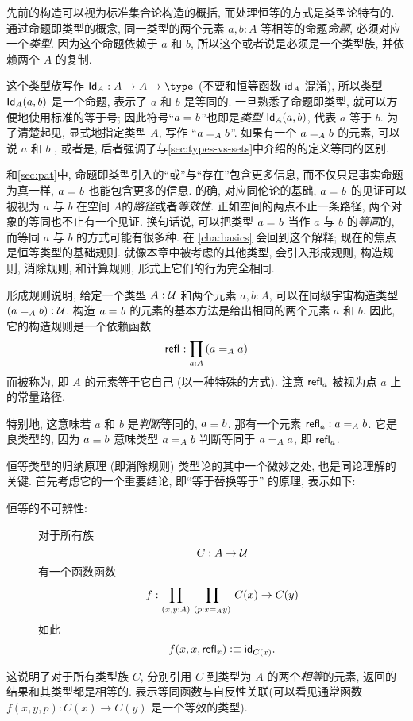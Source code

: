 %
%
%
%
先前的构造可以视为标准集合论构造的概括, 而处理恒等的方式是类型论特有的.
通过命题即类型的概念, 同一类型的两个元素 $a,b:A$ 等相等的命题\emph{命题}, 必须对应一个\emph{类型}.
因为这个命题依赖于 $a$ 和 $b$, 所以这个或者说是必须是一个类型族, 并依赖两个 $A$ 的复制.

这个类型族写作 $\idtypevar{A}:A\to A\to\type$ (不要和恒等函数 $\idfunc[A]$ 混淆), 所以类型 $\idtype[A]ab$ 是一个命题, 表示了 $a$ 和 $b$ 是等同的.
一旦熟悉了命题即类型, 就可以方便地使用标准的等于号;
因此符号``$\id{a}{b}$''也即是\emph{类型} $\idtype[A]ab$, 代表 $a$ 等于 $b$.
为了清楚起见, 显式地指定类型 $A$, 写作 ``$\id[A]{a}{b}$''.
如果有一个 $\id[A]{a}{b}$ 的元素, 可以说 $a$ 和 $b$ , 或者是, 后者强调了与\cref{sec:types-vs-sets}中介绍的的定义等同的区别.
%
%

和\cref{sec:pat}中, 命题即类型引入的``或''与``存在''包含更多信息, 而不仅只是事实命题为真一样, $\id{a}{b}$ 也能包含更多的信息.
的确, 对应同伦论的基础, $\id{a}{b}$ 的见证可以被视为 $a$ 与 $b$ 在空间 $A$的\emph{路径}或者\emph{等效性}.
正如空间的两点不止一条路径, 两个对象的等同也不止有一个见证.
换句话说, 可以把类型 $\id{a}{b}$ 当作 $a$ 与 $b$ 的\emph{等同}的, 而等同 $a$ 与 $b$ 的方式可能有很多种.
在 \cref{cha:basics} 会回到这个解释;
现在的焦点是恒等类型的基础规则.
就像本章中被考虑的其他类型, 会引入形成规则, 构造规则, 消除规则, 和计算规则, 形式上它们的行为完全相同.

形成规则说明, 给定一个类型 $A:\UU$ 和两个元素 $a,b:A$, 可以在同级宇宙构造类型 $(\id[A]{a}{b}):\UU$.
构造 $\id{a}{b}$ 的元素的基本方法是给出相同的两个元素 $a$ 和 $b$.
因此, 它的构造规则是一个依赖函数
\[
    \refl{} : \prd{a:A} (\id[A]{a}{a})
\]
而被称为,
%
即 $A$ 的元素等于它自己 (以一种特殊的方式).
注意 $\refl{a}$ 被视为点 $a$ 上的常量路径.

特别地, 这意味若 $a$ 和 $b$ 是\emph{判断}等同的, $a\jdeq b$, 那有一个元素 $\refl{a} : \id[A]{a}{b}$.
它是良类型的, 因为 $a\jdeq b$ 意味类型 $\id[A]{a}{b}$ 判断等同于 $\id[A]{a}{a}$, 即 $\refl{a}$.

恒等类型的归纳原理 (即消除规则) 类型论的其中一个微妙之处, 也是同论理解的关键.
首先考虑它的一个重要结论, 即``等于替换等于'' 的原理, 表示如下: %
%
\begin{description}
    \item[恒等的不可辨性:]
    对于所有族
    \[
        C : A \to \UU
    \]
    有一个函数函数
    \[
        f : \prd{x,y:A}{p:\id[A] x y} C(x) \to C(y)
    \]
    如此
    \[
        f(x,x,\refl{x}) \defeq \idfunc[C(x)].
    \]
\end{description}
这说明了对于所有类型族 $C$, 分别引用 $C$ 到类型为  $A$ 的两个\emph{相等}的元素, 返回的结果和其类型都是相等的.
表示等同函数与自反性关联(可以看见通常函数 $f(x,y,p): C(x) \to C(y)$ 是一个等效的类型).

